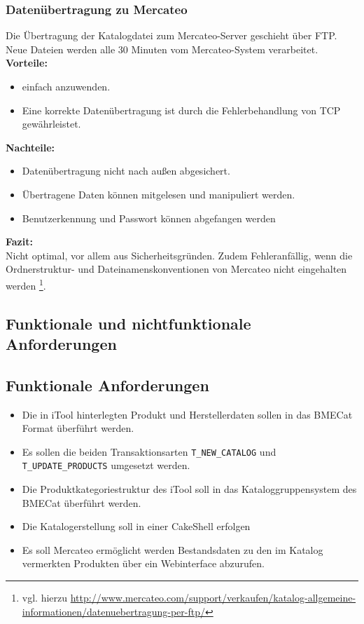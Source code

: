 	
	
	\subsubsection{Datenübertragung zu Mercateo}
	
	Die Übertragung der Katalogdatei zum Mercateo-Server geschieht über FTP. Neue Dateien werden alle 30 Minuten vom Mercateo-System verarbeitet.\\
	\textbf{Vorteile:}
 	\begin{itemize}[noitemsep]
   	\item einfach anzuwenden.
   	\item Eine korrekte Datenübertragung ist durch die Fehlerbehandlung von TCP gewährleistet.
   	\end{itemize}
	\textbf{Nachteile:}
   	\begin{itemize}[noitemsep]
   	\item Datenübertragung nicht nach außen abgesichert.
   	\item Übertragene Daten können mitgelesen und manipuliert werden.
   	\item Benutzerkennung und Passwort können abgefangen werden
   	\end{itemize}
   	\textbf{Fazit:}\\
	Nicht optimal, vor allem aus Sicherheitsgründen. Zudem Fehleranfällig, wenn die Ordnerstruktur- und Dateinamenskonventionen von Mercateo nicht eingehalten werden \footnote{vgl. hierzu \url{http://www.mercateo.com/support/verkaufen/katalog-allgemeine-informationen/datenuebertragung-per-ftp/}}.

		
		
	\subsection{Funktionale und nichtfunktionale Anforderungen}	
	
	\subsection{Funktionale Anforderungen}
	\begin{itemize}
	\item Die in iTool hinterlegten Produkt und Herstellerdaten sollen in das BMECat Format überführt werden.
	\item Es sollen die beiden Transaktionsarten \texttt{T\_NEW\_CATALOG}  und \texttt{T\_UPDATE\_PRODUCTS} umgesetzt werden.
	\item Die Produktkategoriestruktur des iTool soll in das Kataloggruppensystem des BMECat überführt werden.
	\item Die Katalogerstellung soll in einer CakeShell erfolgen
	\item Es soll Mercateo ermöglicht werden Bestandsdaten zu den im Katalog vermerkten Produkten über ein Webinterface abzurufen.
	
	\end{itemize}
